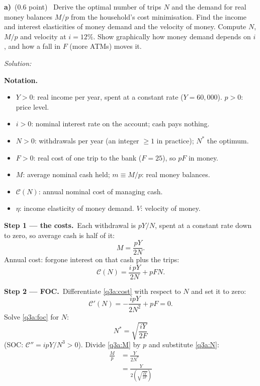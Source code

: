 \documentclass[11pt,a4paper]{article}
\newif\ifsolucoes
\newcommand{\espacoresol}{6cm}
\newcommand{\parte}[2]{\par\Needspace{6\baselineskip}\medskip\noindent\textbf{#1)}~(#2)~}
\newcommand{\resolespaco}{\ifsolucoes\else\par\textit{Solution:}\vspace{\espacoresol}\par\fi}
\newcommand{\passo}[2]{\par\smallskip\noindent\textbf{Step #1.}~#2}
\newenvironment{notacao}{\par\smallskip\noindent\textbf{Notation.}\begin{itemize}[leftmargin=1.4em,topsep=1pt,itemsep=0pt]\small}{\end{itemize}}
\begin{document}
\parte{a}{0.6 point} Derive the optimal number of trips $N$ and the demand for real money balances $M/p$ from the
household's cost minimisation. Find the income and interest elasticities of money demand and the velocity of
money. Compute $N$, $M/p$ and velocity at $i=12\%$. Show graphically how money demand depends on $i$, and how a
fall in $F$ (more ATMs) moves it.
\resolespaco
\begin{sol}
\begin{notacao}
\item $Y>0$: real income per year, spent at a constant rate ($Y=60{,}000$). $p>0$: price level.
\item $i>0$: nominal interest rate on the account; cash pays nothing.
\item $N>0$: withdrawals per year (an integer $\ge1$ in practice); $N^*$ the optimum.
\item $F>0$: real cost of one trip to the bank ($F=25$), so $pF$ in money.
\item $M$: average nominal cash held; $m\equiv M/p$: real money balances.
\item $\mathcal C(N)$: annual nominal cost of managing cash.
\item $\eta$: income elasticity of money demand. $V$: velocity of money.
\end{notacao}
\passo{1 --- the costs}{Each withdrawal is $pY/N$, spent at a constant rate down to zero, so average cash is
half of it:
\begin{equation}
M=\frac{pY}{2N}. \label{q3a:M}
\end{equation}
Annual cost: forgone interest on that cash plus the trips:
\begin{equation}
\mathcal C(N)=\frac{i\,pY}{2N}+pFN. \label{q3a:cost}
\end{equation}}
\passo{2 --- FOC}{Differentiate \eqref{q3a:cost} with respect to $N$ and set it to zero:
\begin{equation}
\mathcal C'(N)=-\frac{ipY}{2N^2}+pF=0. \label{q3a:foc}
\end{equation}
Solve \eqref{q3a:foc} for $N$:
\begin{equation}
\boxed{N^*=\sqrt{\frac{iY}{2F}}} \label{q3a:N}
\end{equation}
(SOC: $\mathcal C''=ipY/N^3>0$). Divide \eqref{q3a:M} by $p$ and substitute \eqref{q3a:N}:
\begin{align}
\frac{M}{p} &= \frac{Y}{2N^*}\nonumber\\
&= \frac{Y}{2\left(\sqrt{\frac{iY}{2F}}\right)}\nonumber\\

\end{align}}
\end{sol}
\end{document}
